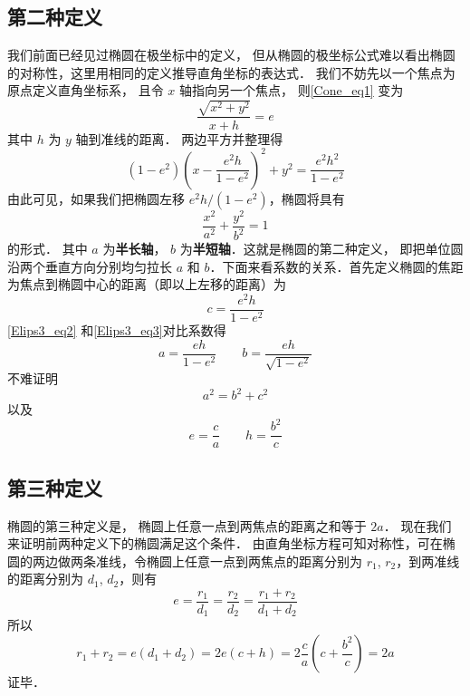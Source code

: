 

\subsection{第二种定义}
我们前面已经见过椭圆在极坐标中的定义， 但从椭圆的极坐标公式难以看出椭圆的对称性，这里用相同的定义推导直角坐标的表达式． 我们不妨先以一个焦点为原点定义直角坐标系， 且令 $x$ 轴指向另一个焦点， 则\autoref{Cone_eq1} 变为
\begin{equation}
\frac{\sqrt {x^2 + y^2} }{x + h} = e
\end{equation}
其中 $h$ 为 $y$ 轴到准线的距离． 两边平方并整理得
\begin{equation}\label{Elips3_eq2}
(1 - {e^2}){\left( x - \frac{e^2 h}{1 - {e^2}} \right)^2} + y^2 = \frac{e^2 h^2}{1 - e^2}
\end{equation}
由此可见，如果我们把椭圆左移 $e^2 h/(1 - e^2)$，椭圆将具有
\begin{equation}\label{Elips3_eq3}
\frac{x^2}{a^2} + \frac{y^2}{b^2} = 1
\end{equation}
的形式． 其中 $a$ 为\textbf{半长轴}， $b$ 为\textbf{半短轴}．这就是椭圆的第二种定义， 即把单位圆沿两个垂直方向分别均匀拉长 $a$ 和 $b$．下面来看系数的关系．首先定义椭圆的焦距为焦点到椭圆中心的距离（即以上左移的距离）为
\begin{equation}
c = \frac{e^2 h}{1 - e^2}
\end{equation}
\autoref{Elips3_eq2} 和\autoref{Elips3_eq3}对比系数得
\begin{equation}
a = \frac{eh}{1 - e^2} \qquad b = \frac{eh}{\sqrt {1 - e^2} }
\end{equation}
不难证明
\begin{equation}
a^2 = b^2 + c^2
\end{equation}
以及
\begin{equation}
e = \frac{c}{a} \qquad h = \frac{b^2}{c}
\end{equation}

\subsection{第三种定义}
椭圆的第三种定义是， 椭圆上任意一点到两焦点的距离之和等于 $2a$． 现在我们来证明前两种定义下的椭圆满足这个条件． 由直角坐标方程可知对称性，可在椭圆的两边做两条准线，令椭圆上任意一点到两焦点的距离分别为 $r_1$, $r_2$，到两准线的距离分别为 $d_1$, $d_2$，则有
\begin{equation}
e = \frac{r_1}{d_1} = \frac{r_2}{d_2} = \frac{r_1 + r_2}{d_1 + d_2}
\end{equation}
所以
\begin{equation}
{r_1} + {r_2} = e(d_1+d_2) = 2e(c + h) = 2\frac{c}{a}\left( c + \frac{b^2}{c} \right) = 2a
\end{equation}
证毕．
